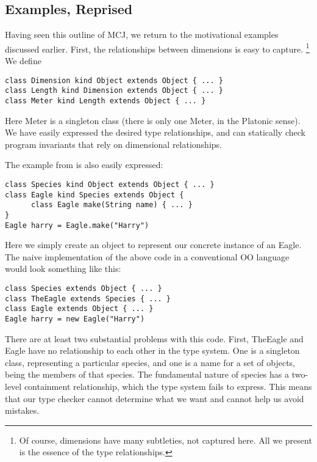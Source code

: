\documentclass{acm-sigplan}
\begin{document}
\subsection{Examples, Reprised}

\label{examples}

Having seen this outline of MCJ, we return to the motivational
examples discussed earlier.  First, the relationships between
dimensions is easy to capture. \footnote{Of course, dimensions have
many subtleties, not captured here.  All we present is the essence of
the type relationships.} We define 

\begin{verbatim}
class Dimension kind Object extends Object { ... }
class Length kind Dimension extends Object { ... }
class Meter kind Length extends Object { ... }
\end{verbatim}

Here {\txt Meter} is a singleton class (there is only one Meter, in
the Platonic sense).  We have easily expressed the desired type
relationships, and can statically check program invariants that rely
on dimensional relationships.

The example from \cite{FW96} is also easily expressed:

\begin{verbatim}
class Species kind Object extends Object { ... }
class Eagle kind Species extends Object {
      class Eagle make(String name) { ... }
}
Eagle harry = Eagle.make("Harry")
\end{verbatim}

Here we simply create an object to represent our concrete instance of
an Eagle.  The naive implementation of the above code in a
conventional OO language would look something like this:

\begin{verbatim}
class Species extends Object { ... }
class TheEagle extends Species { ... }
class Eagle extends Object { ... }
Eagle harry = new Eagle("Harry")
\end{verbatim}

There are at least two substantial problems with this code.  First,
{\txt TheEagle} and {\txt Eagle} have no relationship to each other in
the type system.  One is a singleton class, representing a particular
species, and one is a name for a set of objects, being the members of
that species.  The fundamental nature of species has a two-level
containment relationship, which the type system fails to express.
This means that our type checker cannot determine what we want and
cannot help us avoid mistakes.
\end{document}
